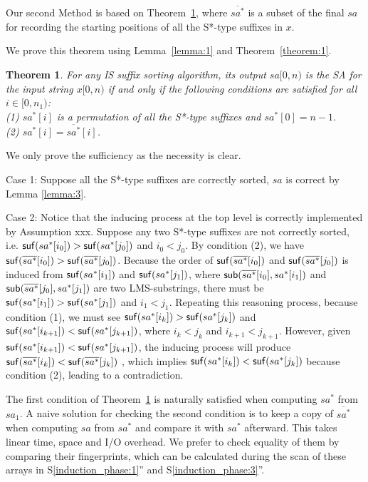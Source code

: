 \documentclass[10pt,journal,compsoc]{IEEEtran}
\newtheorem{theorem}{Theorem}[section]
\begin{document}
Our second Method is based on Theorem~\ref{theorem:2}, where $\overline{sa^*}$ is a subset of the final $sa$ for recording the starting positions of all the S*-type suffixes in $x$. {\color{blue}  We prove this theorem using Lemma~\ref{lemma:1} and Theorem~\ref{theorem:1}. 
\begin{theorem} \label{theorem:2}
	For any IS suffix sorting algorithm, its output $sa[0, n)$ is the SA for the input string $x[0, n)$ if and only if the following conditions are satisfied for all $i \in [0, n_1)$: \\
	(1) $sa^*[i]$ is a permutation of all the S*-type suffixes and  $sa^*[0]=n-1$. \\
	(2) $sa^*[i] = \overline{sa^*}[i]$. \\
\end{theorem}

\begin{IEEEproof}
	We only prove the sufficiency as the necessity is clear.

	Case 1: Suppose all the S*-type suffixes are correctly sorted, $sa$ is correct by Lemma \ref{lemma:3}.
		
	Case 2: {\color{red} Notice that the inducing process at the top level is correctly implemented by Assumption xxx.} 
	Suppose any two S*-type suffixes are not correctly sorted, i.e. ${\sf suf}(sa^*[i_0])>{\sf suf}(sa^*[j_0])$ and $i_0<j_0$. By condition (2), we have ${\sf suf}(\overline{sa^*}[i_0])>{\sf suf}(\overline{sa^*}[j_0])$. Because the order of ${\sf suf}(\overline{sa^*}[i_0])$ and ${\sf suf}(\overline{sa^*}[j_0])$ is induced from ${\sf suf}(sa^*[i_1])$ and ${\sf suf}(sa^*[j_1])$, where ${\sf sub}(\overline{sa^*}[i_0], sa^*[i_1])$ and ${\sf sub}(\overline{sa^*}[j_0], sa^*[j_1])$ are two LMS-substrings, there must be ${\sf suf}(sa^*[i_1])>{\sf suf}(sa^*[j_1])$ and $i_1<j_1$. Repeating this reasoning process, because condition (1), we must see ${\sf suf}(sa^*[i_k])>{\sf suf}(sa^*[j_k])$ and ${\sf suf}(sa^*[i_{k+1}])<{\sf suf}(sa^*[j_{k+1}])$, where $i_k<j_k$ and $i_{k+1}<j_{k+1}$. However, given ${\sf suf}(sa^*[i_{k+1}])<{\sf suf}(sa^*[j_{k+1}])$, the inducing process will produce ${\sf suf}(\overline{sa^*}[i_k])<{\sf suf}(\overline{sa^*}[j_k])$ , which implies ${\sf suf}(sa^*[i_k])<{\sf suf}(sa^*[j_k])$ because condition (2), leading to a contradiction.
\end{IEEEproof}
	

The first condition of Theorem~\ref{theorem:2} is naturally satisfied when computing $sa^*$ from $sa_1$. A naive solution for checking the second condition is to keep a copy of $\overline{sa^*}$ when computing $sa$ from $sa^*$ and compare it with $sa^*$ afterward. This takes linear time, space and I/O overhead. We prefer to check equality of them by comparing their fingerprints, which can be calculated during the scan of these arrays in S\ref{induction_phase:1}'' and S\ref{induction_phase:3}''. 

}
\end{document}
